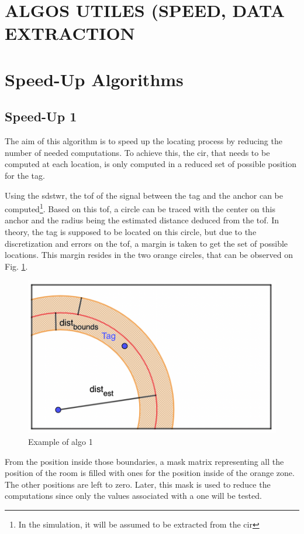 \color{red}
\section{ALGOS UTILES (SPEED, DATA EXTRACTION}
\color{black}

\section{Speed-Up Algorithms}

\subsection{Speed-Up 1}

The aim of this algorithm is to speed up the locating process by reducing the number of needed computations. To achieve this, the \gls{cir}, that needs to be computed at each location, is only computed in a reduced set of possible position for the tag.
\vspace{2mm}

Using the \gls{sdstwr}, the \gls{tof} of the signal between the tag and the anchor can be computed\footnote{In the simulation, it will be assumed to be extracted from the \gls{cir}}. Based on this \gls{tof}, a circle can be traced with the center on this anchor and the radius being the estimated distance deduced from the \gls{tof}. In theory, the tag is supposed to be located on this circle, but due to the discretization and errors on the \gls{tof}, a margin is taken to get the set of possible locations. This margin resides in the two orange circles, that can be observed on Fig. \ref{fig:speedup_1}.
\vspace{2mm}

\begin{figure}[H]
\centering
\includegraphics[width=.65\linewidth]{Images/algo_1.png}
\caption{Example of algo 1}
\label{fig:speedup_1}
\end{figure}

From the position inside those boundaries, a mask matrix representing all the position of the room is filled with ones for the position inside of the orange zone. The other positions are left to zero. Later, this mask is used to reduce the computations since only the values associated with a one will be tested.

